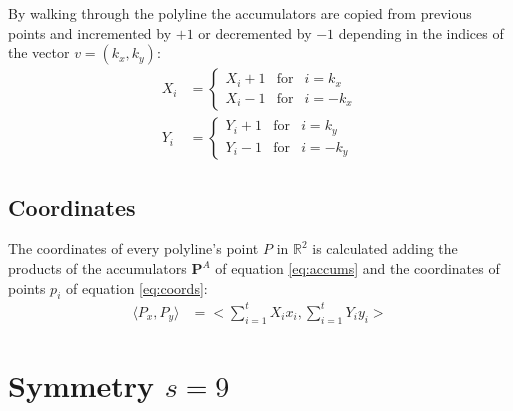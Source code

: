 \documentclass[11pt]{article}
\begin{document}
By walking through the polyline the accumulators are copied from previous points and incremented by $+1$ or decremented by $-1$ depending in the indices of the vector $v = (k_x,k_y)$:
\begin{align}
X_i &= \left\{ \begin{array}{ccl}
 X_i + 1 & \mbox{for} & i = k_x \\
 X_i - 1 & \mbox{for} & i = -k_x
 \end{array}\right. \\
Y_i &= \left\{ \begin{array}{ccl}
 Y_i + 1 & \mbox{for} & i = k_y \\
 Y_i - 1 & \mbox{for} & i = -k_y
 \end{array}\right.
\end{align}

\subsection{Coordinates}

The coordinates of every polyline's point $P$ in $\mathbb{R}^2$ is calculated adding the products of the accumulators $\textbf{P}^A$ of equation \ref{eq:accums} and the coordinates of points $p_i$ of equation \ref{eq:coords}:
\begin{align}
\langle P_x,P_y\rangle &= 
 \biggl< \sum_{i=1}^{t}X_ix_i, \sum_{i=1}^{t}Y_iy_i \biggr> \label{eq:absolute}
\end{align}

\section{Symmetry $s=9$}
\end{document}

